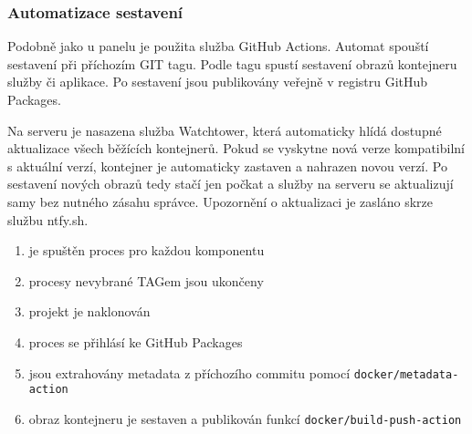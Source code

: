 \subsubsection{Automatizace sestavení}
Podobně jako u panelu je použita služba GitHub Actions. Automat spouští sestavení při příchozím GIT tagu. Podle tagu spustí sestavení obrazů kontejneru služby či aplikace. Po sestavení jsou publikovány veřejně v registru GitHub Packages.

Na serveru je nasazena služba Watchtower\cite{ContainrrrWatchtower2024}, která automaticky hlídá dostupné aktualizace všech běžících kontejnerů. Pokud se vyskytne nová verze kompatibilní s aktuální verzí, kontejner je automaticky zastaven a nahrazen novou verzí. Po sestavení nových obrazů tedy stačí jen počkat a služby na serveru se aktualizují samy bez nutného zásahu správce. Upozornění o aktualizaci je zasláno skrze službu ntfy.sh\cite{NtfyShPush}.

\begin{enumerate}
    \item je spuštěn proces pro každou komponentu
    \item procesy nevybrané TAGem jsou ukončeny
    \item projekt je naklonován
    \item proces se přihlásí ke GitHub Packages
    \item jsou extrahovány metadata z příchozího commitu pomocí \lstinline|docker/metadata-action|
    \item obraz kontejneru je sestaven a publikován funkcí \lstinline|docker/build-push-action|
\end{enumerate}
